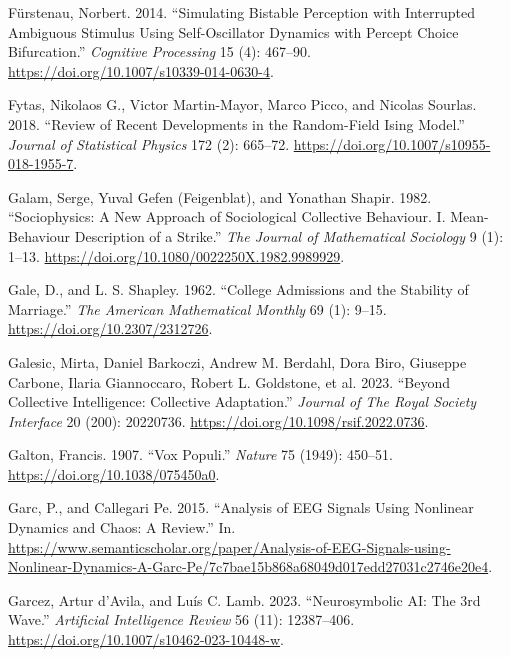 \documentclass[
  a4paper,
  DIV=11,
  numbers=noendperiod,
  oneside]{scrreprt}
\newlength{\cslhangindent}
\newlength{\cslentryspacingunit} %
\newenvironment{CSLReferences}[2] %
 {%
  \setlength{\parindent}{0pt}
  \ifodd #1
  \let\oldpar\par
  \def\par{\hangindent=\cslhangindent\oldpar}
  \fi
  \setlength{\parskip}{#2\cslentryspacingunit}
 }%
 {}
\begin{document}
\begin{CSLReferences}{1}{0}
\leavevmode{}%
Fürstenau, Norbert. 2014. {``Simulating Bistable Perception with
Interrupted Ambiguous Stimulus Using Self-Oscillator Dynamics with
Percept Choice Bifurcation.''} \emph{Cognitive Processing} 15 (4):
467--90. \url{https://doi.org/10.1007/s10339-014-0630-4}.

\leavevmode{}%
Fytas, Nikolaos G., Victor Martin-Mayor, Marco Picco, and Nicolas
Sourlas. 2018. {``Review of Recent Developments in the Random-Field
{Ising} Model.''} \emph{Journal of Statistical Physics} 172 (2):
665--72. \url{https://doi.org/10.1007/s10955-018-1955-7}.

\leavevmode{}%
Galam, Serge, Yuval Gefen (Feigenblat), and Yonathan Shapir. 1982.
{``Sociophysics: {A} New Approach of Sociological Collective Behaviour.
{I}. Mean-Behaviour Description of a Strike.''} \emph{The Journal of
Mathematical Sociology} 9 (1): 1--13.
\url{https://doi.org/10.1080/0022250X.1982.9989929}.

\leavevmode{}%
Gale, D., and L. S. Shapley. 1962. {``College {Admissions} and the
{Stability} of {Marriage}.''} \emph{The American Mathematical Monthly}
69 (1): 9--15. \url{https://doi.org/10.2307/2312726}.

\leavevmode{}%
Galesic, Mirta, Daniel Barkoczi, Andrew M. Berdahl, Dora Biro, Giuseppe
Carbone, Ilaria Giannoccaro, Robert L. Goldstone, et al. 2023. {``Beyond
Collective Intelligence: {Collective} Adaptation.''} \emph{Journal of
The Royal Society Interface} 20 (200): 20220736.
\url{https://doi.org/10.1098/rsif.2022.0736}.

\leavevmode{}%
Galton, Francis. 1907. {``Vox Populi.''} \emph{Nature} 75 (1949):
450--51. \url{https://doi.org/10.1038/075450a0}.

\leavevmode{}%
Garc, P., and Callegari Pe. 2015. {``Analysis of EEG Signals Using
Nonlinear Dynamics and Chaos: A Review.''} In.
\url{https://www.semanticscholar.org/paper/Analysis-of-EEG-Signals-using-Nonlinear-Dynamics-A-Garc-Pe/7c7bae15b868a68049d017edd27031c2746e20e4}.

\leavevmode{}%
Garcez, Artur d'Avila, and Luís C. Lamb. 2023. {``Neurosymbolic AI: The
3rd Wave.''} \emph{Artificial Intelligence Review} 56 (11): 12387--406.
\url{https://doi.org/10.1007/s10462-023-10448-w}.


\end{CSLReferences}
\end{document}
